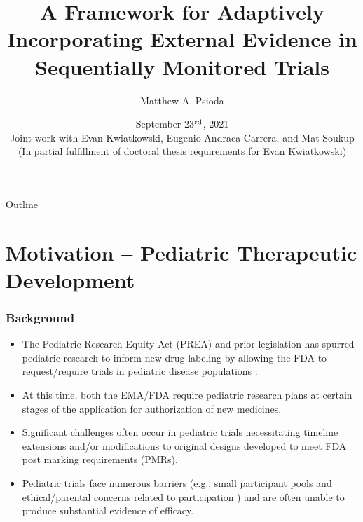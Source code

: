 \documentclass{beamer}
\title[]{A Framework for Adaptively Incorporating External Evidence in Sequentially Monitored Trials}
\author[]{
Matthew A. Psioda %
}
\institute{
Department of Biostatistics, University of North Carolina at Chapel Hill%
}
\date{\scriptsize{September 23$\textsuperscript{rd}$, 2021} \\ \vspace{0.5cm} 
 \tiny{Joint work with Evan Kwiatkowski, Eugenio Andraca-Carrera, and Mat Soukup} \\
 \tiny{(In partial fulfillment of doctoral thesis requirements for Evan Kwiatkowski)} }
\begin{document}
\beamertemplatefootpagenumber
\maketitle

\begin{frame}{Outline}
 \tableofcontents
\end{frame}

\section{Motivation -- Pediatric Therapeutic Development}

\begin{frame} \frametitle{Background}
	\begin{itemize}
		
		\item The Pediatric Research Equity Act (PREA) and prior legislation has spurred pediatric
		      research to inform new drug labeling by allowing the FDA to request/require trials 
					in pediatric disease populations \citep{Avant2018}.	

		\vspace{0.5cm}				
		\item At this time, both the EMA/FDA require pediatric research plans at certain stages 
		      of the application for authorization of new medicines.	

	 \vspace{0.5cm}	
		\item Significant challenges often occur in pediatric trials necessitating 
					timeline extensions and/or modifications to original designs developed to meet 
					FDA post marking requirements (PMRs).				
			
    \vspace{0.5cm}
		\item Pediatric trials face numerous barriers (e.g., small 
					participant pools and ethical/parental concerns related to participation \citep{Greenberg2018})
					and are often unable to produce substantial evidence of efficacy.
													
	\end{itemize}
\end{frame}
%
%
%
%
\end{document}
